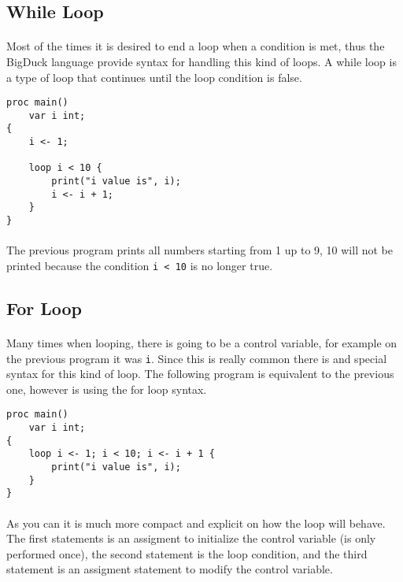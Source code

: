 \subsection{While Loop}

\paragraph{} Most of the times it is desired to end a loop when a condition is
met, thus the BigDuck language provide syntax for handling this kind of loops.
A while loop is a type of loop that continues until the loop condition is false.

\begin{verbatim}
proc main()
    var i int;
{
    i <- 1;

    loop i < 10 {
        print("i value is", i);
        i <- i + 1;
    }
}
\end{verbatim}

\paragraph{} The previous program prints all numbers starting from 1 up to 9,
10 will not be printed because the condition \texttt{i < 10} is no longer true.

\subsection{For Loop}

\paragraph{} Many times when looping, there is going to be a control variable,
for example on the previous program it was \texttt{i}. Since this is really
common there is and special syntax for this kind of loop. The following program
is equivalent to the previous one, however is using the for loop syntax.

\begin{verbatim}
proc main()
    var i int;
{
    loop i <- 1; i < 10; i <- i + 1 {
        print("i value is", i);
    }
}
\end{verbatim}

\paragraph{} As you can it is much more compact and explicit on how the loop
will behave. The first statements is an assigment to initialize the control
variable (is only performed once), the second statement is the loop condition,
and the third statement is an assigment statement to modify the control
variable.

